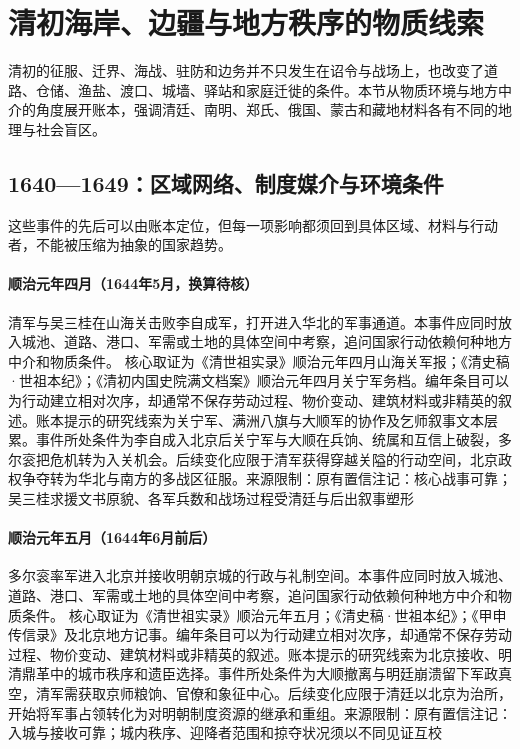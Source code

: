\section{清初海岸、边疆与地方秩序的物质线索}
清初的征服、迁界、海战、驻防和边务并不只发生在诏令与战场上，也改变了道路、仓储、渔盐、渡口、城墙、驿站和家庭迁徙的条件。本节从物质环境与地方中介的角度展开账本，强调清廷、南明、郑氏、俄国、蒙古和藏地材料各有不同的地理与社会盲区。
\subsection{1640—1649：区域网络、制度媒介与环境条件}
这些事件的先后可以由账本定位，但每一项影响都须回到具体区域、材料与行动者，不能被压缩为抽象的国家趋势。
\hypertarget{civic:EQ-1644-SHANHAIGUAN}{}\paragraph{顺治元年四月（1644年5月，换算待核）}清军与吴三桂在山海关击败李自成军，打开进入华北的军事通道。本事件应同时放入城池、道路、港口、军需或土地的具体空间中考察，追问国家行动依赖何种地方中介和物质条件。 核心取证为《清世祖实录》顺治元年四月山海关军报；《清史稿·世祖本纪》；《清初内国史院满文档案》顺治元年四月关宁军务档。编年条目可以为行动建立相对次序，却通常不保存劳动过程、物价变动、建筑材料或非精英的叙述。账本提示的研究线索为关宁军、满洲八旗与大顺军的协作及乞师叙事文本层累。事件所处条件为李自成入北京后关宁军与大顺在兵饷、统属和互信上破裂，多尔衮把危机转为入关机会。后续变化应限于清军获得穿越关隘的行动空间，北京政权争夺转为华北与南方的多战区征服。来源限制：原有置信注记：核心战事可靠；吴三桂求援文书原貌、各军兵数和战场过程受清廷与后出叙事塑形
\hypertarget{civic:EQ-1644-BEIJING-ENTRY}{}\paragraph{顺治元年五月（1644年6月前后）}多尔衮率军进入北京并接收明朝京城的行政与礼制空间。本事件应同时放入城池、道路、港口、军需或土地的具体空间中考察，追问国家行动依赖何种地方中介和物质条件。 核心取证为《清世祖实录》顺治元年五月；《清史稿·世祖本纪》；《甲申传信录》及北京地方记事。编年条目可以为行动建立相对次序，却通常不保存劳动过程、物价变动、建筑材料或非精英的叙述。账本提示的研究线索为北京接收、明清鼎革中的城市秩序和遗臣选择。事件所处条件为大顺撤离与明廷崩溃留下军政真空，清军需获取京师粮饷、官僚和象征中心。后续变化应限于清廷以北京为治所，开始将军事占领转化为对明朝制度资源的继承和重组。来源限制：原有置信注记：入城与接收可靠；城内秩序、迎降者范围和掠夺状况须以不同见证互校
